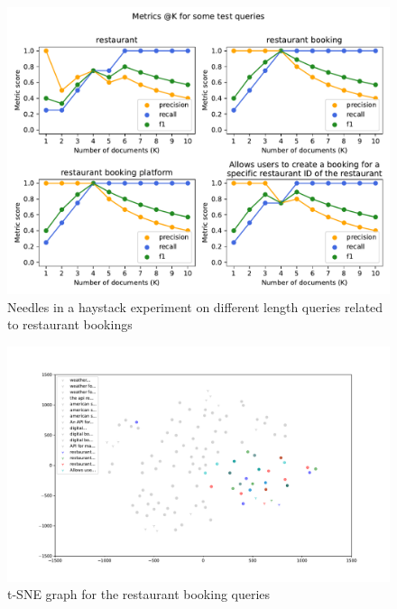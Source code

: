 \begin{figure}[!h]
    \begin{center}
        \includegraphics[width=0.8\linewidth]{assets/pdf/evaluation/prec-rec-restaurant}
    \end{center}

    \caption{Needles in a haystack experiment on different length queries related to restaurant bookings}
    \label{fig:nh-5}
\end{figure}

\begin{figure}[!h]
    \begin{center}
        \includegraphics[width=0.8\linewidth]{assets/pdf/evaluation/tsne-restaurant}
    \end{center}

    \caption{t-SNE graph for the restaurant booking queries}
    \label{fig:tsne-5}
\end{figure}


